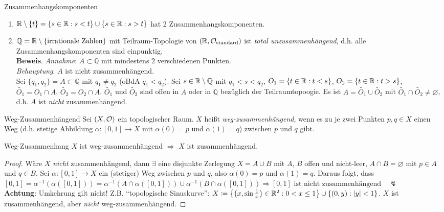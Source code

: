 \begin{example}{Zusammenhangskomponenten}
  \begin{enumerate}
    \item $ \mathbb{R} \setminus \{ t \} = \{ s \in \mathbb{R} : s < t \} \cup \{ s \in \mathbb{R} : s > t \} $ hat 2 Zusammenhangskomponenten.
    \item $ \mathbb{Q} = \mathbb{R} \setminus \{ \text{irrationale Zahlen} \} $ mit Teilraum-Topologie von $ (\mathbb{R}, \mathcal{O}_\text{standard}) $ ist \emph{total unzusammenhängend}, d.h. alle Zusammenhangskomponenten sind einpunktig. \\
    \textbf{Beweis}. \emph{Annahme}: $ A \subset \mathbb{Q} $ mit mindestens $ 2 $ verschiedenen Punkten. \\
    \emph{Behauptung}: $ A $ ist nicht zusammenhängend. \\
    Sei $ \{ q_1, q_2 \} = A \subset \mathbb{Q} $ mit $ q_1 \neq q_2 $ (oBdA $ q_1 < q_2 $). Sei $ s \in \mathbb{R} \setminus \mathbb{Q} $ mit $ q_1 < s < q_2 $, $ O_1 = \{ t \in \mathbb{R}: t < s \} $, $ O_2 = \{ t \in \mathbb{R} : t > s \} $, $ \widetilde{O_1} = O_1 \cap A $, $ \widetilde{O_2} = O_2 \cap A $. $ \widetilde{O_1} $ und $ \widetilde{O_2} $ sind offen in $ A $ oder in $ \mathbb{Q} $ bezüglich der Teilraumtopoogie. Es ist $ A = \widetilde{O_1} \cup \widetilde{O_2} $ mit $ \widetilde{O_1} \cap \widetilde{O_2} \neq \varnothing $, d.h. $ A $ ist \emph{nicht} zusammenhängend.
  \end{enumerate}
\end{example}

\begin{definition}{Weg-Zusammenhängend}
  Sei $ (X, \mathcal{O}) $ ein topologischer Raum. $ X $ heißt \emph{weg-zusammenhängend}, wenn es zu je zwei Punkten $ p, q \in X $ einen Weg (d.h. stetige Abbildung $ \alpha : [0,1] \to X $ mit $ \alpha(0) = p $ und $ \alpha(1) = q $) zwischen $ p $ und $ q $ gibt.
\end{definition}

\begin{lemma}{Weg-Zusammenhang}
  $ X $ ist weg-zusammenhängend $ \Rightarrow $ $ X $ ist zusammenhängend.
  \begin{proof}
    Wäre $ X $ \emph{nicht} zusammenhängend, dann $ \exists $ eine disjunkte Zerlegung $ X = A \cup B $ mit $ A $, $ B $ offen und nicht-leer, $ A \cap B = \varnothing $ mit $ p \in A $ und $ q \in B $. Sei $ \alpha: [0,1] \to X $ ein (stetiger) Weg zwischen $ p $ und $ q $, also $ \alpha(0) = p $ und $ \alpha(1) = q $. Daraus folgt, dass $ [0,1] = \alpha^{-1}(\alpha([0,1])) = \alpha^{-1}(A \cap \alpha([0,1])) \cup \alpha^{-1}(B \cap \alpha([0,1])) \Rightarrow [0,1] \text{ ist nicht zusammenhängend} \quad \lightning $ \\
    \textbf{Achtung}: Umkehrung gilt nicht! Z.B. ``topologische Sinuskurve'': $ X \coloneqq \left\{ \left( x, \sin\tfrac{1}{x} \right) \in \mathbb{R}^2 : 0 < x \leq 1 \right\} \cup \{ (0,y) : \vert y \vert < 1 \} $. $ X $ ist zusammenhängend, aber \emph{nicht} weg-zusammenhängend.
  \end{proof}
\end{lemma}